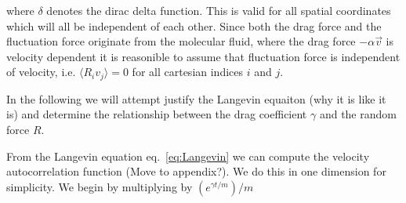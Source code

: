 where $\delta$ denotes the dirac delta function. This is valid for all spatial
coordinates which will all be independent of each other. Since both the drag
force and the fluctuation force originate from the molecular fluid, where the
drag force $-\alpha \vec{v}$ is velocity dependent it is reasonible to assume
that fluctuation force is independent of velocity, i.e. $\langle R_i v_j \rangle
= 0$ for all cartesian indices $i$ and $j$.



In the following we will attempt justify the Langevin equaiton (why it is like
it is) and determine the relationship between the drag coefficient $\gamma$ and
the random force $R$.


From the Langevin equation eq.~\eqref{eq:Langevin} we can compute the velocity
autocorrelation function (Move to appendix?). We do this in one dimension for
simplicity. We begin by multiplying by $(e^{\gamma t /m})/m$

